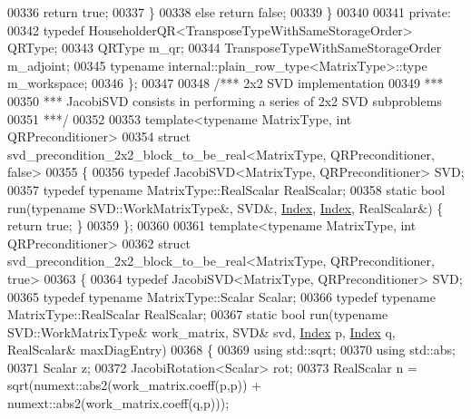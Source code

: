 \begin{DoxyCode}
00336       \textcolor{keywordflow}{return} \textcolor{keyword}{true};
00337     \}
00338     \textcolor{keywordflow}{else} \textcolor{keywordflow}{return} \textcolor{keyword}{false};
00339   \}
00340 
00341 \textcolor{keyword}{private}:
00342   \textcolor{keyword}{typedef} HouseholderQR<TransposeTypeWithSameStorageOrder> QRType;
00343   QRType m\_qr;
00344   TransposeTypeWithSameStorageOrder m\_adjoint;
00345   \textcolor{keyword}{typename} internal::plain\_row\_type<MatrixType>::type m\_workspace;
00346 \};
00347 
00348 \textcolor{comment}{/*** 2x2 SVD implementation}
00349 \textcolor{comment}{ ***}
00350 \textcolor{comment}{ *** JacobiSVD consists in performing a series of 2x2 SVD subproblems}
00351 \textcolor{comment}{ ***/}
00352 
00353 \textcolor{keyword}{template}<\textcolor{keyword}{typename} MatrixType, \textcolor{keywordtype}{int} QRPreconditioner>
00354 \textcolor{keyword}{struct }svd\_precondition\_2x2\_block\_to\_be\_real<MatrixType, QRPreconditioner, false>
00355 \{
00356   \textcolor{keyword}{typedef} JacobiSVD<MatrixType, QRPreconditioner> SVD;
00357   \textcolor{keyword}{typedef} \textcolor{keyword}{typename} MatrixType::RealScalar RealScalar;
00358   \textcolor{keyword}{static} \textcolor{keywordtype}{bool} run(\textcolor{keyword}{typename} SVD::WorkMatrixType&, SVD&, \hyperlink{namespace_eigen_a62e77e0933482dafde8fe197d9a2cfde}{Index}, \hyperlink{namespace_eigen_a62e77e0933482dafde8fe197d9a2cfde}{Index}, RealScalar&) \{ \textcolor{keywordflow}{return} \textcolor{keyword}{true}; 
      \}
00359 \};
00360 
00361 \textcolor{keyword}{template}<\textcolor{keyword}{typename} MatrixType, \textcolor{keywordtype}{int} QRPreconditioner>
00362 \textcolor{keyword}{struct }svd\_precondition\_2x2\_block\_to\_be\_real<MatrixType, QRPreconditioner, true>
00363 \{
00364   \textcolor{keyword}{typedef} JacobiSVD<MatrixType, QRPreconditioner> SVD;
00365   \textcolor{keyword}{typedef} \textcolor{keyword}{typename} MatrixType::Scalar Scalar;
00366   \textcolor{keyword}{typedef} \textcolor{keyword}{typename} MatrixType::RealScalar RealScalar;
00367   \textcolor{keyword}{static} \textcolor{keywordtype}{bool} run(\textcolor{keyword}{typename} SVD::WorkMatrixType& work\_matrix, SVD& svd, \hyperlink{namespace_eigen_a62e77e0933482dafde8fe197d9a2cfde}{Index} p, 
      \hyperlink{namespace_eigen_a62e77e0933482dafde8fe197d9a2cfde}{Index} q, RealScalar& maxDiagEntry)
00368   \{
00369     \textcolor{keyword}{using} std::sqrt;
00370     \textcolor{keyword}{using} std::abs;
00371     Scalar z;
00372     JacobiRotation<Scalar> rot;
00373     RealScalar n = sqrt(numext::abs2(work\_matrix.coeff(p,p)) + numext::abs2(work\_matrix.coeff(q,p)));

\end{DoxyCode}
